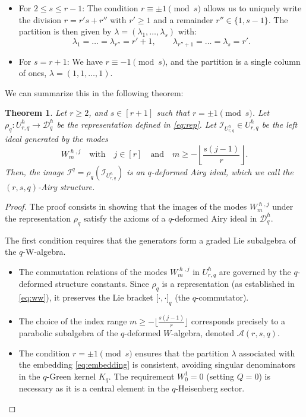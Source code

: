 \documentclass[reqno,11pt]{amsart}
\theoremstyle{plain}
\newtheorem{theorem}{Theorem}[section]
\theoremstyle{definition}
\theoremstyle{remark}
\numberwithin{equation}{section}
\newcommand{\1}{\mathds{1}}
\newcommand{\2}{\frac{1}{2}}
\begin{document}
{\begin{itemize}
					\item {For $2 \leq s \leq r-1$:} The condition $r \equiv \pm 1 \pmod{s}$ allows us to uniquely write the division $r = r' s + r''$ with $r' \geq 1$ and a remainder $r'' \in \{1, s-1\}$. The partition is then given by $\lambda = (\lambda_1, \dots, \lambda_s)$ with:
					\begin{equation}
						\lambda_1 = \dots = \lambda_{r''} = r'+1, \qquad \lambda_{r''+1} = \dots = \lambda_s = r'.
					\end{equation}
					\item {For $s=r+1$:} We have $r \equiv -1 \pmod{s}$, and the partition is a single column of ones, $\lambda = (1, 1, \dots, 1)$.
				\end{itemize}
				
				We can summarize this in the following theorem:
				
				\begin{theorem}\label{t:rsAs}
					Let $ r \geq 2$, and $ s \in [r+1]$ such that $ r = \pm 1 \pmod{s}$. Let $\rho_{q}: U^\hslash_{r,q} \to \mathcal{D}_{q}^\hslash$ be the representation defined in \eqref{eq:rep}. Let $\mathcal{I}_{U_{r,q}^\hslash} \in U^\hslash_{r,q}$ be the left ideal generated by the  modes
					\begin{equation}
						W^{\hslash,j}_m \quad \text{with} \quad j \in [r] \quad \text{and} \quad m \geq - \left\lfloor \frac{s(j-1)}{r} \right\rfloor.
					\end{equation} 
					Then, the image $\mathcal{I}^q = \rho_q(\mathcal{I}_{U_{r,q}^\hslash})$ 
					is an $q$-deformed Airy ideal, which we call the  $(r,s,q)$-Airy structure.
				\end{theorem}
				\begin{proof}
					{The proof consists in showing that the images of the modes $W^{\hslash,j}_m$ under the representation $\rho_q$ satisfy the axioms of a $q$-deformed Airy ideal in $\mathcal{D}_q^\hslash$.}
					
					{The first condition requires that the generators form a graded Lie subalgebra of the $q$-W-algebra. 
						\begin{itemize}
							\item[(i)] The commutation relations of the modes $W^{\hslash,j}_m$ in $U^\hslash_{r,q}$ are governed by the $q$-deformed structure constants. Since $\rho_q$ is a representation (as established in \eqref{eq:ww}), it preserves the Lie bracket $\big[ \cdot, \cdot \big]_{q}$ (the $q$-commutator).
							\item[(ii)] 
							The choice of the index range $m \geq - \lfloor \frac{s(j-1)}{r} \rfloor$ corresponds precisely to a parabolic subalgebra of the $q$-deformed $W$-algebra, denoted $\mathcal{A}(r,s,q)$. 
							\item[(iii)] The condition $r = \pm 1 \pmod{s}$ ensures that the partition $\lambda$ associated with the embedding \eqref{eq:embedding} is consistent, avoiding singular denominators in the $q$-Green kernel ${K}_q$. The requirement $W^1_0 = 0$ (setting $Q=0$) is necessary as it is a central element in the $q$-Heisenberg sector.
					\end{itemize}}
					

\end{proof}}
\end{document}
